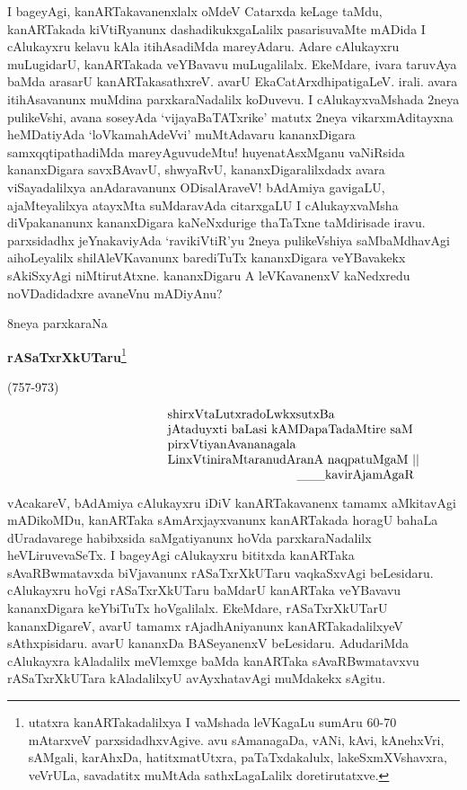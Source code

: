 \documentclass[11pt,a4size]{article}
\begin{document}
I bageyAgi, kanARTakavanenxlalx oMdeV Catarxda keLage taMdu,
kanARTakada kiVtiRyanunx dashadikukxgaLalilx pasarisuvaMte mADida I
cAlukayxru kelavu kAla itihAsadiMda mareyAdaru. Adare cAlukayxru
muLugidarU, kanARTakada veYBavavu muLugalilalx. EkeMdare, ivara
taruvAya baMda arasarU kanARTakasathxreV. avarU
EkaCatArxdhipatigaLeV. irali. avara itihAsavanunx muMdina
parxkaraNadalilx koDuvevu. I cAlukayxvaMshada 2neya pulikeVshi, avana
soseyAda `vijayaBaTATxrike' matutx 2neya vikarxmAditayxna heMDatiyAda
`loVkamahAdeVvi' muMtAdavaru kananxDigara samxqqtipathadiMda
mareyAguvudeMtu! huyenatAsxMganu vaNiRsida kananxDigara savxBAvavU,
shwyaRvU, kananxDigaralilxdadx avara viSayadalilxya anAdaravanunx
ODisalAraveV! bAdAmiya gavigaLU, ajaMteyalilxya atayxMta suMdaravAda
citarxgaLU I cAlukayxvaMsha diVpakananunx kananxDigara kaNeNxdurige
thaTaTxne taMdirisade iravu. parxsidadhx jeYnakaviyAda `ravikiVtiR'yu
2neya pulikeVshiya saMbaMdhavAgi aihoLeyalilx shilAleVKavanunx
barediTuTx kananxDigara veYBavakekx sAkiSxyAgi
niMtirutAtxne. kananxDigaru A leVKavanenxV kaNedxredu noVDadidadxre
avaneVnu mADiyAnu?


\bigskip

\begin{center}
{\Huge 8neya parxkaraNa}

\smallskip
\textbf{\LARGE rASaTxrXkUTaru}\footnote[1]{utatxra kanARTakadalilxya I
vaMshada leVKagaLu sumAru 60-70 mAtarxveV parxsidadhxvAgive. avu
sAmanagaDa, vANi, kAvi, kAnehxVri, sAMgali, karAhxDa, hatitxmatUtxra,
paTaTxdakalulx, lakeSxmXVshavxra, veVrULa, savadatitx muMtAda
sathxLagaLalilx doretirutatxve.}

{\Large(757-973)}
\end{center} 

$$
\vbox{\parskip=0pt\parindent=0pt \everypar{\hskip12em} \obeylines
shirxVtaLutxradoLwkxsutxBa
jAtaduyxti baLasi kAMDapaTadaMtire saM
pirxVtiyanAvananagala
LinxVtiniraMtaranudAranA naqpatuMgaM\index{naqpatuMga} ||

\hspace{3.5cm} \_\_\_kavirAjamAgaR}\index{kavirAjamAgaR}
$$

vAcakareV, bAdAmiya cAlukayxru iDiV kanARTakavanenx tamamx aMkitavAgi
mADikoMDu, kanARTaka sAmArxjayxvanunx kanARTakada horagU bahaLa
dUradavarege habibxsida saMgatiyanunx hoVda parxkaraNadalilx
heVLiruvevaSeTx. I bageyAgi cAlukayxru bititxda kanARTaka
sAvaRBwmatavxda biVjavanunx rASaTxrXkUTaru vaqkaSxvAgi
beLesidaru. cAlukayxru hoVgi rASaTxrXkUTaru baMdarU kanARTaka
veYBavavu kananxDigara keYbiTuTx hoVgalilalx. EkeMdare, rASaTxrXkUTarU
kananxDigareV, avarU tamamx rAjadhAniyanunx kanARTakadalilxyeV
sAthxpisidaru. avarU kananxDa BASeyanenxV beLesidaru. AdudariMda
cAlukayxra kAladalilx meVlemxge baMda kanARTaka sAvaRBwmatavxvu
rASaTxrXkUTara kAladalilxyU avAyxhatavAgi muMdakekx sAgitu.
\end{document}

